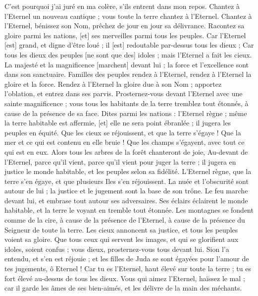 \begin{multicols}{2}
C'est pourquoi j'ai juré en ma colère, s'ils entrent dans mon repos.
\VerseOne{}Chantez à l'Eternel un nouveau cantique ; vous toute la terre chantez à l'Eternel.
Chantez à l'Eternel, bénissez son Nom, prêchez de jour en jour sa délivrance.
Racontez sa gloire parmi les nations, [et] ses merveilles parmi tous les peuples.
Car l'Eternel [est] grand, et digne d'être loué ; il [est] redoutable par-dessus tous les dieux ;
Car tous les dieux des peuples [ne sont que des] idoles ; mais l'Eternel a fait les cieux.
La majesté et la magnificence [marchent] devant lui ; la force et l'excellence sont dans son sanctuaire.
Familles des peuples rendez à l'Eternel, rendez à l'Eternel la gloire et la force.
Rendez à l'Eternel la gloire due à son Nom ; apportez l'oblation, et entrez dans ses parvis.
Prosternez-vous devant l'Eternel avec une sainte magnificence ; vous tous les habitants de la terre tremblez tout étonnés, à cause de la présence de sa face.
Dites parmi les nations : l'Eternel règne ; même la terre habitable est affermie, [et] elle ne sera point ébranlée ; il jugera les peuples en équité.
Que les cieux se réjouissent, et que la terre s'égaye ! Que la mer et ce qui est contenu en elle bruie !
Que les champs s'égayent, avec tout ce qui est en eux. Alors tous les arbres de la forêt chanteront de joie,
Au-devant de l'Eternel, parce qu'il vient, parce qu'il vient pour juger la terre ; il jugera en justice le monde habitable, et les peuples selon sa fidélité.
\VerseOne{}L'Eternel règne, que la terre s'en égaye, et que plusieurs Iles s'en réjouissent.
La nuée et l'obscurité sont autour de lui ; la justice et le jugement sont la base de son trône.
Le feu marche devant lui, et embrase tout autour ses adversaires.
Ses éclairs éclairent le monde habitable, et la terre le voyant en tremble tout étonnée.
Les montagnes se fondent comme de la cire, à cause de la présence de l'Eternel, à cause de la présence du Seigneur de toute la terre.
Les cieux annoncent sa justice, et tous les peuples voient sa gloire.
Que tous ceux qui servent les images, et qui se glorifient aux idoles, soient confus ; vous dieux, prosternez-vous tous devant lui.
Sion l'a entendu, et s'en est réjouie ; et les filles de Juda se sont égayées pour l'amour de tes jugements, ô Eternel !
Car tu es l'Eternel, haut élevé sur toute la terre ; tu es fort élevé au-dessus de tous les dieux.
Vous qui aimez l'Eternel, haïssez le mal ; car il garde les âmes de ses bien-aimés, et les délivre de la main des méchants.

\end{multicols}
